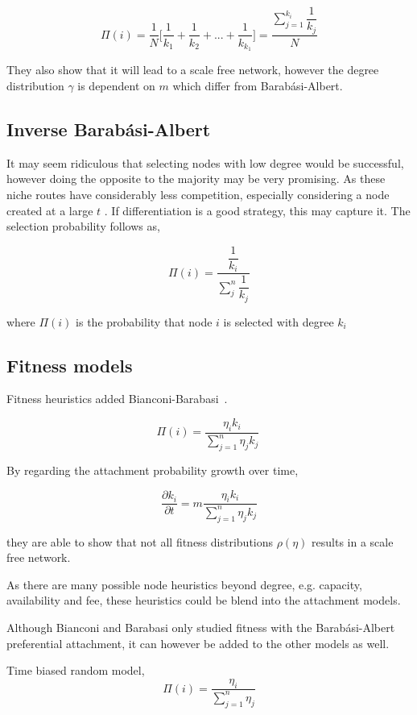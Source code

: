 \[ \Pi(i) = \dfrac{1}{N} \bigg\lbrack \dfrac{1}{k_1} + \dfrac{1}{k_2} + ... + \dfrac{1}{k_{k_1}} \bigg\rbrack = \dfrac{\sum_{j=1}^{k_i}\dfrac{1}{k_j}}{N} \]

They also show that it will lead to a scale free network, however the degree distribution $\gamma$ is dependent on $m$ which differ from Barabási-Albert.

\subsection{Inverse Barabási-Albert}


It may seem ridiculous that selecting nodes with low degree would be successful, however doing the opposite to the majority may be very promising. As these niche routes have considerably less competition, especially considering a node created at a large $t$ . If differentiation is a good strategy, this may capture it. The selection probability follows as, 

\[ \Pi(i) =  \dfrac{\dfrac{1}{k_i}}{\sum_{j}^{n} \dfrac{1}{k_j}} \]

where $\Pi(i)$ is the probability that node $i$ is selected with degree $k_i$

\subsection{Fitness models}

Fitness heuristics added Bianconi-Barabasi~\cite{bianconi:barabasi:fitness:network}.

\[ \Pi(i) = \dfrac{\eta_ik_i}{\sum_{j=1}^{n}\eta_jk_j}\ \]

By regarding the attachment probability growth over time,

\[ \dfrac{\partial k_i}{\partial t} = m \dfrac{\eta_ik_i}{\sum_{j=1}^{n}\eta_jk_j} \]

they are able to show that not all fitness distributions $\rho(\eta)$ results in a scale free network.

As there are many possible node heuristics beyond degree, e.g. capacity, availability and fee, these heuristics could be blend into the attachment models. 

Although Bianconi and Barabasi only studied fitness with the Barabási-Albert preferential attachment, it can however be added to the other models as well.

Time biased random model,
~
\[ \Pi(i) = \dfrac{\eta_i}{\sum_{j=1}^{n} \eta_j} \]

